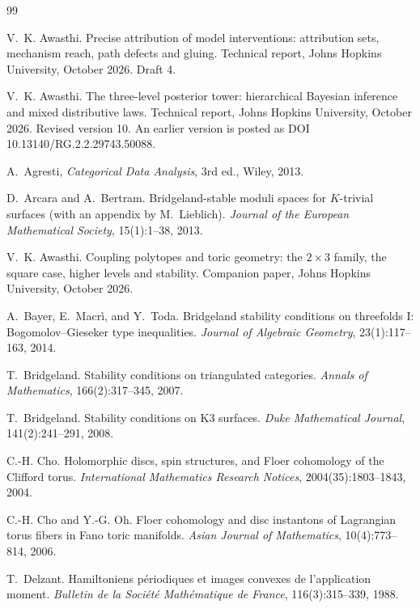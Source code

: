 \documentclass[11pt]{article}
\theoremstyle{definition}
\theoremstyle{remark}
\begin{document}
\begin{thebibliography}{99}

V.~K. Awasthi.
\newblock Precise attribution of model interventions: attribution sets, mechanism reach, path defects
and gluing.
\newblock Technical report, Johns Hopkins University, October 2026. Draft 4.

V.~K. Awasthi.
\newblock The three-level posterior tower: hierarchical {B}ayesian inference and mixed distributive laws.
\newblock Technical report, Johns Hopkins University, October 2026. Revised version 10. An earlier
version is posted as DOI 10.13140/RG.2.2.29743.50088.

A.~Agresti, \emph{Categorical Data Analysis}, 3rd ed., Wiley, 2013.

D.~Arcara and A.~Bertram.
\newblock Bridgeland-stable moduli spaces for {$K$}-trivial surfaces (with an appendix by M.~Lieblich).
\newblock \emph{Journal of the European Mathematical Society}, 15(1):1--38, 2013.

V.~K. Awasthi.
\newblock Coupling polytopes and toric geometry: the $2\times3$ family, the square case, higher levels and stability.
\newblock Companion paper, Johns Hopkins University, October 2026.

A.~Bayer, E.~Macr\`i, and Y.~Toda.
\newblock Bridgeland stability conditions on threefolds {I}: {B}ogomolov--{G}ieseker type inequalities.
\newblock \emph{Journal of Algebraic Geometry}, 23(1):117--163, 2014.

T.~Bridgeland.
\newblock Stability conditions on triangulated categories.
\newblock \emph{Annals of Mathematics}, 166(2):317--345, 2007.

T.~Bridgeland.
\newblock Stability conditions on {K}3 surfaces.
\newblock \emph{Duke Mathematical Journal}, 141(2):241--291, 2008.

C.-H. Cho.
\newblock Holomorphic discs, spin structures, and {F}loer cohomology of the {C}lifford torus.
\newblock \emph{International Mathematics Research Notices}, 2004(35):1803--1843, 2004.

C.-H. Cho and Y.-G. Oh.
\newblock Floer cohomology and disc instantons of {L}agrangian torus fibers in {F}ano toric manifolds.
\newblock \emph{Asian Journal of Mathematics}, 10(4):773--814, 2006.

T.~Delzant.
\newblock Hamiltoniens p\'eriodiques et images convexes de l'application moment.
\newblock \emph{Bulletin de la Soci\'et\'e Math\'ematique de France}, 116(3):315--339, 1988.


\end{thebibliography}
\end{document}
